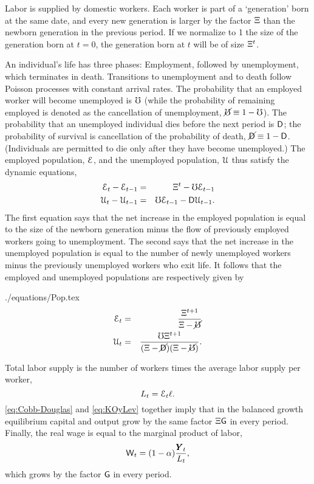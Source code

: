 \documentclass[titlepage,abstract,letterpaper]{econtex}
\renewcommand{\GDPLev}{\ensuremath{\pmb{Y}}}
\begin{document}
Labor is supplied by domestic workers. Each worker is part of a `generation' born at the same date, and every new generation is larger by the factor $\Xi$ than the newborn generation in the previous period. If we normalize to 1 the size of the generation born at $t=0$, the generation born at $t$ will be of size $\Xi^t$.

An individual's life has three phases: Employment, followed by
unemployment, which terminates in death. Transitions to unemployment
and to death follow Poisson processes with constant arrival rates. The
probability that an employed worker will become unemployed is $\mho$
(while the probability of remaining employed is denoted as the cancellation of unemployment, $\cancel{\mho} \equiv 1-\mho$).
The probability that an unemployed individual dies before the next
period is $\mathsf{D}$; the probability of survival is
cancellation of the probability of death, $\cancel{\mathsf{D}} \equiv 1-\mathsf{D}$. (Individuals are
permitted to die only after they have become unemployed.) The employed
population, $\mathcal{E}$, and the unemployed population, $\mathcal{U}$ thus
satisfy the dynamic equations,
\begin{eqnarray*}
  \mathcal{E}_t - \mathcal{E}_{t-1} & = & \Xi^t-\mho \mathcal{E}_{t-1}
\\  \mathcal{U}_t - \mathcal{U}_{t-1} & = &\mho \mathcal{E}_{t-1} - \mathsf{D} \mathcal{U}_{t-1}.
\end{eqnarray*}
The first equation says that the net increase in the employed population is equal to the size of the newborn generation minus the flow of previously employed workers going to unemployment. The second says that the net increase in the unemployed population is equal to the number of newly unemployed workers minus the previously unemployed workers who exit life. It follows that the employed and unemployed populations are respectively given by
\begin{verbatimwrite}{./equations/Pop.tex}
\begin{eqnarray*}
\mathcal{E}_t & = & \frac{\Xi^{t+1}}{\Xi-\cancel{\mho}} \label{eq:PopEt}
\\ \mathcal{U}_t & = & \frac{\mho \Xi^{t+1}}{(\Xi-\cancel{\mathsf{D}})(\Xi-\cancel{\mho})}. \label{eq:PopUt}
\end{eqnarray*} %
\end{verbatimwrite}


Total labor supply is the number of workers times the average labor supply per worker,
\begin{equation}
L_t = \mathcal{E}_t \ell.
\label{eq:Lt}
\end{equation}
\eqref{eq:Cobb-Douglas} and \eqref{eq:KOyLev} together imply that in
the balanced growth equilibrium capital and output grow by the same
factor $\Xi \mathsf{G}$ in every period.  Finally, the real wage is
equal to the marginal product of labor,
\begin{equation*}
\Wage_t =(1-\kapShare)\frac{\GDPLev_t}{\LLev_t},
\end{equation*}
which grows by the factor $\mathsf{G}$ in every period.
\end{document}
